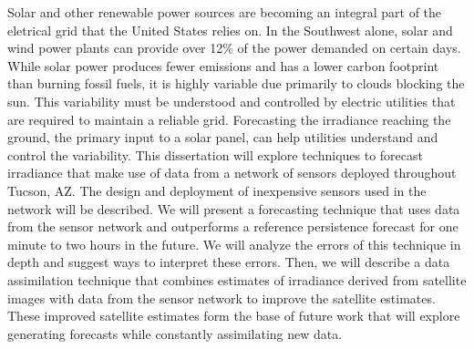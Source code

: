 Solar and other renewable power sources are becoming an integral part
of the eletrical grid that the United States relies on.
In the Southwest alone, solar and wind power plants can provide over
12\% of the power demanded on certain days.
While solar power produces fewer emissions and has a lower carbon
footprint than burning fossil fuels, it is highly variable due
primarily to clouds blocking the sun.
This variability must be understood and controlled by electric
utilities that are required to maintain a reliable grid.
Forecasting the irradiance reaching the ground, the primary input to a
solar panel, can help utilities understand and control the
variability.
This dissertation will explore techniques to forecast irradiance that
make use of data from a network of sensors deployed throughout Tucson,
AZ.
The design and deployment of inexpensive sensors used in the network
will be described.
We will present a forecasting technique that uses data from the
sensor network and outperforms a reference persistence forecast for
one minute to two hours in the future.
We will analyze the errors of this technique in depth and suggest ways
to interpret these errors.
Then, we will describe a data assimilation technique that combines
estimates of irradiance derived from satellite images with data from
the sensor network to improve the satellite estimates.
These improved satellite estimates form the base of future work that will
explore generating forecasts while constantly assimilating new data.


